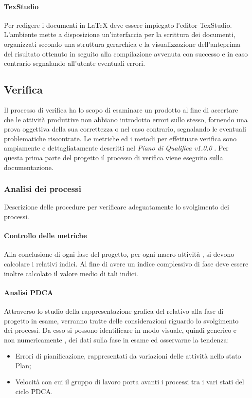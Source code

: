 \paragraph{TexStudio} \Spazio
Per redigere i documenti in \LaTeX \emph{ }deve essere impiegato l'editor TexStudio. L'ambiente mette a disposizione un'interfaccia per la scrittura dei documenti, organizzati secondo una struttura gerarchica e la visualizzazione dell'anteprima del risultato ottenuto in seguito alla compilazione avvenuta con successo e in caso contrario segnalando all'utente eventuali errori.


\subsection{Verifica}
Il processo di verifica ha lo scopo di esaminare un prodotto al fine di accertare che le attività produttive non abbiano introdotto errori sullo stesso, fornendo una prova oggettiva della sua correttezza o nel caso contrario, segnalando le eventuali problematiche riscontrate. Le metriche ed i metodi per effettuare verifica sono ampiamente e dettagliatamente descritti nel \emph{Piano di Qualifica v1.0.0} . Per questa prima parte del progetto il processo di verifica viene eseguito sulla documentazione.

\subsubsection{Analisi dei processi}
Descrizione delle procedure per verificare adeguatamente lo svolgimento dei processi.

\paragraph{Controllo delle metriche} \Spazio
Alla conclusione di ogni fase del progetto, per ogni macro-attività , si devono calcolare i relativi indici. Al fine di avere un indice complessivo di fase deve essere inoltre calcolato il valore medio
di tali indici.

\paragraph{Analisi PDCA} \Spazio
Attraverso lo studio della rappresentazione grafica del  relativo alla fase di progetto in esame, verranno tratte delle considerazioni riguardo lo svolgimento dei processi.
Da esso si possono identificare in modo visuale, quindi generico e non numericamente , dei dati sulla fase in esame ed osservarne la tendenza:
\begin{itemize}
	\item Errori di pianificazione, rappresentati da variazioni delle attività nello stato
	Plan;
	\item Velocità con cui il gruppo di lavoro porta avanti i processi tra i vari stati del
	ciclo PDCA.
\end{itemize}




